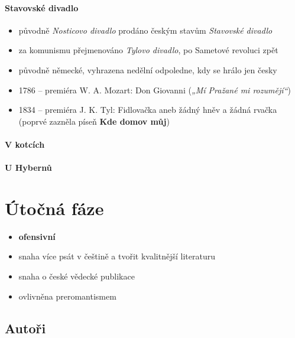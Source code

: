 \paragraph{Stavovské divadlo}
\begin{itemize}
\item původně \textit{Nosticovo divadlo} \ra prodáno českým stavům \ra \textit{Stavovské divadlo}
\item za komunismu přejmenováno \textit{Tylovo divadlo}, po Sametové revoluci zpět
\item původně německé, vyhrazena nedělní odpoledne, kdy se hrálo jen česky
\item 1786 -- premiéra W. A. Mozart: Don Giovanni (\textit{„Mí Pražané mi rozumějí“})
\item 1834 -- premiéra J. K. Tyl: Fidlovačka aneb žádný hněv a žádná rvačka (poprvé zazněla píseň \textbf{Kde domov můj})
\end{itemize}
\paragraph{V kotcích}
\paragraph{U Hybernů}

\section{Útočná fáze}
\begin{itemize}
\item \textbf{ofensivní}
\item snaha více psát v češtině a tvořit kvalitnější literaturu
\item snaha o české vědecké publikace
\item ovlivněna preromantismem
\end{itemize}

\subsection{Autoři}
